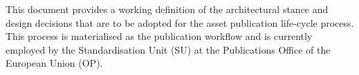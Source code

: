 	This document provides a working definition of the architectural stance and design decisions that are to be adopted for the asset publication life-cycle process. This process is materialised as the publication workflow and is currently employed by the Standardisation Unit (SU) at the Publications Office of the European Union (OP).
	

